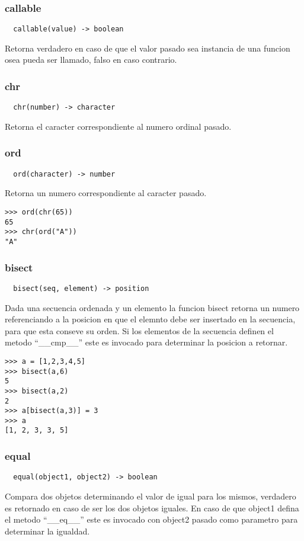 \subsubsection*{callable}
\begin{verbatim}
  callable(value) -> boolean
\end{verbatim}
Retorna verdadero en caso de que el valor pasado sea instancia de una funcion
osea pueda ser llamado, falso en caso contrario.

\subsubsection*{chr}
\begin{verbatim}
  chr(number) -> character
\end{verbatim}
Retorna el caracter correspondiente al numero ordinal pasado.

\subsubsection*{ord}
\begin{verbatim}
  ord(character) -> number
\end{verbatim}
Retorna un numero correspondiente al caracter pasado.
\begin{lstlisting}[style=consola]
>>> ord(chr(65))
65
>>> chr(ord("A"))
"A"
\end{lstlisting}

\subsubsection*{bisect}
\begin{verbatim}
  bisect(seq, element) -> position
\end{verbatim}
Dada una secuencia ordenada y un elemento la funcion bisect retorna un numero referenciando a la posicion en que el elemnto debe ser insertado en la secuencia, para que esta conseve su orden.
Si los elementos de la secuencia definen el metodo ``__cmp__'' este es invocado para determinar la posicion a retornar.
\begin{lstlisting}[style=consola]
>>> a = [1,2,3,4,5]
>>> bisect(a,6)
5
>>> bisect(a,2)
2
>>> a[bisect(a,3)] = 3
>>> a
[1, 2, 3, 3, 5]
\end{lstlisting}

\subsubsection*{equal}
\begin{verbatim}
  equal(object1, object2) -> boolean
\end{verbatim}
Compara dos objetos determinando el valor de igual para los mismos, verdadero es
retornado en caso de ser los dos objetos iguales.
En caso de que object1 defina el metodo ``__eq__'' este es invocado con object2
pasado como parametro para determinar la igualdad.

